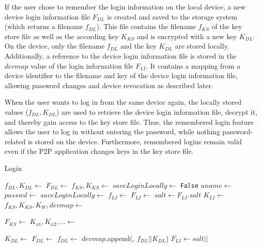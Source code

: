 If the user chose to remember the login information on the local device,
a new device login information file $F_{DL}$ is created and saved to the storage system
(which returns a filename $f_{DL}$). This file contains the filename
$f_{KS}$ of the key store file as well as the according key $K_{KS}$ and is encrypted
with a new key $K_{DL}$. On the device, only the filename $f_{DL}$ and the key $K_{DL}$
are stored locally.
Additionally, a reference to the device login information file is stored in the $devmap$ value
of the login information file $F_{LI}$. It contains a mapping from a device identifier to the filename
and key of the device login information file, allowing password changes and device revocation 
as described later.

When the user wants to log in from the same device again, the
locally stored values ($f_{DL}, K_{DL}$) are used to retrieve the device login
information file, decrypt it, and thereby gain access to the key store
file. Thus, the remembered login feature allows the user to log in
without entering the password, while nothing password-related is
stored on the device. Furthermore, remembered logins remain valid
even if the P2P application changes keys in the key store file.

\begin{algorithm}
\caption{Login}
\begin{algorithmic}[\LineNumFrequency]
\State $f_{DL},K_{DL} \gets$ \DeviceLocalRead
{} 
   \State $F_{DL} \gets$ 
   \State $f_{KS},K_{KS} \gets$ 
   \State $saveLoginLocally \gets$ \texttt{False}
\Else {}
   \State $uname \gets$ 
   \State $passwd \gets$ 
   \State $saveLoginLocally \gets$ 
   \State $f_{LI} \gets$ 
   \State $F_{LI} \gets$ 
   \State $salt \gets F_{LI}.salt$  
   \State $K_{LI} \gets$ 
   \State $f_{KS}, K_{KS}, K_W, devmap \gets$ 
\EndIf

\State $F_{KS} \gets$ 
\State $K_{x1},K_{x2},\dots \gets$ 

   \State $K_{DL} \gets$ \NewKey
   \State $F_{DL} \gets$ 
   \State $f_{DL} \gets$ 
   \State {}
   \State $devmap$.append(\DeviceID, $f_{DL} || K_{DL}$)
   \State $F_{LI} \gets salt || $
   \State {} 
\EndIf

\end{algorithmic}
\end{algorithm}

